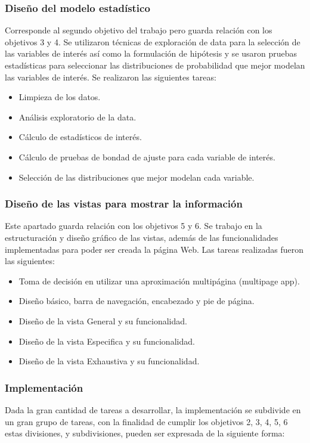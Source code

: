 \subsubsection{Diseño del modelo estadístico}
Corresponde al segundo objetivo del trabajo pero guarda relación con los
objetivos 3 y 4. Se utilizaron técnicas de exploración de data para la
selección de las variables de interés así como la formulación de hipótesis y se
usaron pruebas estadísticas para seleccionar las distribuciones de probabilidad
que mejor modelan las variables de interés. Se realizaron las siguientes
tareas:

\begin{itemize}
    \item Limpieza de los datos.
    \item Análisis exploratorio de la data.
    \item Cálculo de estadísticos de interés.
    \item Cálculo de pruebas de bondad de ajuste para cada variable de interés.
    \item Selección de las distribuciones que mejor modelan cada variable.
\end{itemize}

\subsubsection{Diseño de las vistas para mostrar la información}
Este apartado guarda relación con los objetivos 5 y 6. Se trabajo en la
estructuración y diseño gráfico de las vistas, además de las funcionalidades
implementadas para poder ser creada la página Web. Las tareas realizadas
fueron las siguientes:

\begin{itemize}
    \item Toma de decisión en utilizar una aproximación multipágina (multipage app).
    \item Diseño básico, barra de navegación, encabezado y pie de página.
    \item Diseño de la vista General y su funcionalidad.
    \item Diseño de la vista Especifica y su funcionalidad.
    \item Diseño de la vista Exhaustiva y su funcionalidad.
\end{itemize}

\subsubsection{Implementación}
Dada la gran cantidad de tareas a desarrollar, la implementación se subdivide
en un gran grupo de tareas, con la finalidad de cumplir los objetivos 2, 3, 4, 5, 6
estas divisiones, y subdivisiones, pueden ser expresada de la siguiente forma:

